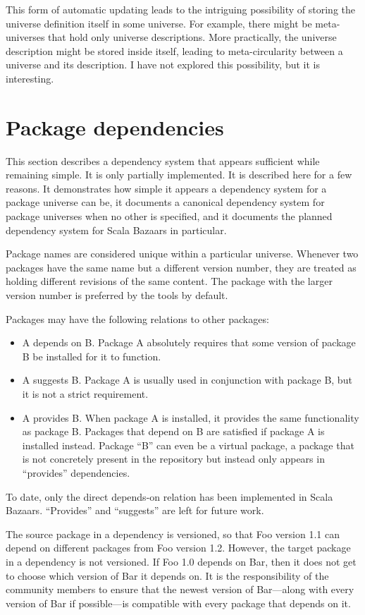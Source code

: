 \documentclass{article}
\begin{document}
This form of automatic updating leads to the intriguing possibility of
storing the universe definition itself in some universe.  For example,
there might be meta-universes that hold only universe descriptions.
More practically, the universe description might be stored inside
itself, leading to meta-circularity between a universe and its
description.  I have not explored this possibility, but it is
interesting.


\section{Package dependencies}
This section describes a dependency system that appears sufficient
while remaining simple.  It is only partially implemented.  It is
described here for a few reasons.  It demonstrates how simple it
appears a dependency system for a package universe can be, it
documents a canonical dependency system for package universes when no
other is specified, and it documents the planned dependency system
for Scala Bazaars in particular.

Package names are considered unique within a particular universe.
Whenever two packages have the same name but a different version
number, they are treated as holding different revisions of the same
content.  The package with the larger version number is preferred by
the tools by default.

Packages may have the following relations to other packages:
\begin{itemize}
\item A depends on B.  Package A absolutely requires that some
      version of package B be installed for it to function.
\item A suggests B.  Package A is usually used in conjunction with
      package B, but it is not a strict requirement.
\item A provides B.  When package A is installed, it provides the same
      functionality as package B.  Packages that depend on B are
      satisfied if package A is installed instead.  Package ``B'' can
      even be a virtual package, a package that is not concretely present
      in the repository but instead only appears in ``provides'' dependencies.
\end{itemize}
To date, only the direct depends-on relation has been implemented in
Scala Bazaars.  ``Provides'' and ``suggests'' are left for future
work.

The source package in a dependency is versioned, so that Foo version
1.1 can depend on different packages from Foo version 1.2.  However,
the target package in a dependency is not versioned.  If Foo 1.0
depends on Bar, then it does not get to choose which version of Bar it
depends on.  It is the responsibility of the community members to
ensure that the newest version of Bar---along with every version of
Bar if possible---is compatible with every package that depends on it.
\end{document}
